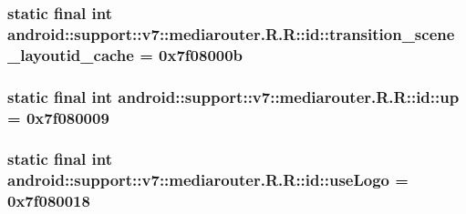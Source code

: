 \hypertarget{classandroid_1_1support_1_1v7_1_1mediarouter_1_1_r_1_1id_b43c23d2cb06b638bd04fd955f2f1e2b}{
\subsubsection[{transition\_\-scene\_\-layoutid\_\-cache}]{\setlength{\rightskip}{0pt plus 5cm}static final int android::support::v7::mediarouter.R.R::id::transition\_\-scene\_\-layoutid\_\-cache = 0x7f08000b}}
\label{classandroid_1_1support_1_1v7_1_1mediarouter_1_1_r_1_1id_b43c23d2cb06b638bd04fd955f2f1e2b}


\hypertarget{classandroid_1_1support_1_1v7_1_1mediarouter_1_1_r_1_1id_11b0e98cc2bada2f2e4e3bc729855726}{
\subsubsection[{up}]{\setlength{\rightskip}{0pt plus 5cm}static final int android::support::v7::mediarouter.R.R::id::up = 0x7f080009}}
\label{classandroid_1_1support_1_1v7_1_1mediarouter_1_1_r_1_1id_11b0e98cc2bada2f2e4e3bc729855726}


\hypertarget{classandroid_1_1support_1_1v7_1_1mediarouter_1_1_r_1_1id_6e506f920da8a2f10a041769b9cc348a}{
\subsubsection[{useLogo}]{\setlength{\rightskip}{0pt plus 5cm}static final int android::support::v7::mediarouter.R.R::id::useLogo = 0x7f080018}}
\label{classandroid_1_1support_1_1v7_1_1mediarouter_1_1_r_1_1id_6e506f920da8a2f10a041769b9cc348a}


